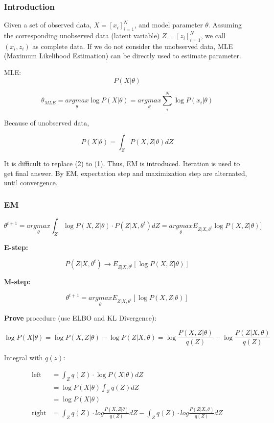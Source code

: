 \documentclass[
]{article}
\begin{document}
\hypertarget{introduction}{%
\subsubsection{Introduction}\label{introduction}}

Given a set of observed data, \(X=[{x_i}]_{i=1}^N\), and model parameter
\(\theta\). Assuming the corresponding unobserved data (latent variable)
\(Z=[{z_i}]_{i=1}^N\), we call \((x_i,z_i)\) as complete data. If we do
not consider the unobserved data, MLE (Maximum Likelihood Estimation)
can be directly used to estimate parameter.

MLE: \[P(X|\theta)\]

\[\theta_{MLE}=\underset {\theta}{argmax} \log P(X|\theta) =\underset {\theta}{argmax} \sum_i^N \log P(x_i|\theta)  \]

Because of unobserved data,

\[P(X|\theta)=\int_Z P(X,Z|\theta)dZ  \]

It is difficult to replace (2) to (1). Thus, EM is introduced. Iteration
is used to get final answer. By EM, expectation step and maximization
step are alternated, until convergence.

\hypertarget{em}{%
\subsubsection{EM}\label{em}}

\[\theta^{t+1}=\underset {\theta}{argmax} \int_Z \log P(X,Z|\theta)\cdot P(Z|X,\theta^t)dZ
=\underset {\theta}{argmax} E_{Z|X,\theta^t} \log P(X,Z|\theta)]\]

\textbf{E-step:}

\[P(Z|X,\theta^t) \rightarrow E_{Z|X,\theta^t} [\log P(X,Z|\theta)]\]

\textbf{M-step:}

\[\theta^{t+1}=\underset {\theta}{argmax} E_{Z|X,\theta^t} [\log P(X,Z|\theta)]\]

\textbf{Prove} procedure (use ELBO and KL Divergence):

\[\log P(X|\theta)=\log P(X,Z|\theta)-\log P(Z|X,\theta) =\log\frac {P(X,Z|\theta)} {q(Z)}-\log\frac{P(Z|X,\theta)} {q(Z)}\]

Integral with \(q(z)\):

\begin{align}

\text{left}&=\int_Z q(Z)\cdot \log P(X|\theta)dZ\\

&=\log P(X|\theta)\int_Z q(Z)dZ\\

&=\log P(X|\theta)\\


\text{right}&=\int_Z q(Z)\cdot log\frac {P(X,Z|\theta)} {q(Z)}dZ-\int_Z q(Z)\cdot log\frac{P(Z|X,\theta)} {q(Z)}dZ\\

\end{align}
\end{document}
